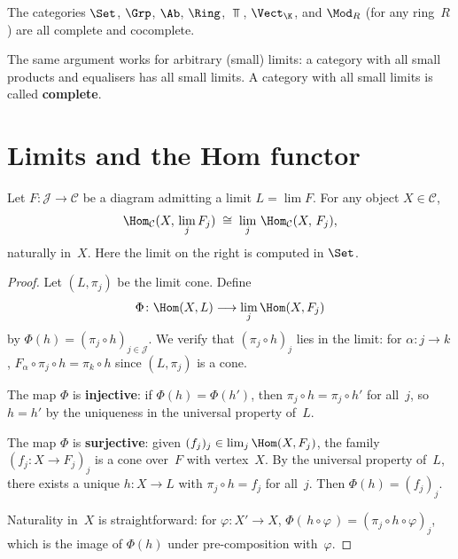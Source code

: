 \begin{example}\label{ex:complete-categories}
The categories $\Set$, $\Grp$, $\Ab$, $\Ring$, $\Top$, $\Vect_\K$,
and $\Mod_R$ (for any ring~$R$) are all complete and cocomplete.
\end{example}

\begin{remark}\label{rem:limits-general}
The same argument works for arbitrary (small) limits: a category
with all small products and equalisers has all small limits.
A category with all small limits is called \textbf{complete}.
\end{remark}


\section{Limits and the Hom functor}\label{sec:limits-hom}

\begin{theorem}\label{thm:lim-hom}
Let $F\colon\mathcal{J}\to\mathcal{C}$ be a diagram admitting a limit
$L = \lim F$.  For any object $X\in\mathcal{C}$,
\[
    \Hom_{\mathcal{C}}(X,\,\lim_{j} F_j)
    \;\cong\;
    \lim_{j}\, \Hom_{\mathcal{C}}(X,\,F_j),
\]
naturally in~$X$.  Here the limit on the right is computed in $\Set$.
\end{theorem}

\begin{proof}
Let $(L,\pi_j)$ be the limit cone.  Define
\[
    \Phi\colon \Hom(X,L) \longrightarrow \lim_j\Hom(X,F_j)
\]
by $\Phi(h) = (\pi_j\circ h)_{j\in\mathcal{J}}$.  We verify that
$(\pi_j\circ h)_j$ lies in the limit: for $\alpha\colon j\to k$,
$F_\alpha\circ\pi_j\circ h = \pi_k\circ h$ since $(L,\pi_j)$ is a cone.

The map $\Phi$ is \textbf{injective}: if $\Phi(h)=\Phi(h')$,
then $\pi_j\circ h = \pi_j\circ h'$ for all~$j$, so $h = h'$
by the uniqueness in the universal property of~$L$.

The map $\Phi$ is \textbf{surjective}: given
$(f_j)_j\in\lim_j\Hom(X,F_j)$, the family $(f_j\colon X\to F_j)_j$
is a cone over~$F$ with vertex~$X$.
By the universal property of~$L$, there exists a unique
$h\colon X\to L$ with $\pi_j\circ h = f_j$ for all~$j$.
Then $\Phi(h) = (f_j)_j$.

Naturality in~$X$ is straightforward: for $\varphi\colon X'\to X$,
$\Phi(\,h\circ\varphi\,) = (\pi_j\circ h\circ\varphi)_j$,
which is the image of $\Phi(h)$ under pre-composition with~$\varphi$.
\end{proof}

